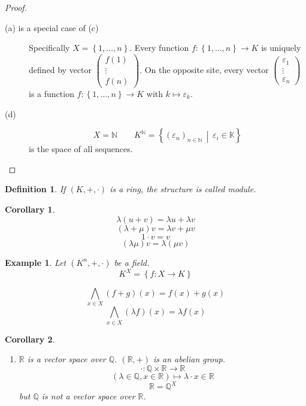 \documentclass[a4paper,landscape,twocolumn]{article}
\newcommand\set[1]{\left\{#1\right\}}
\newcommand\setdef[2]{\left\{#1\,\middle|\,#2\right\}}
\newtheorem{defi}{Definition}
\newtheorem{ex}{Example}
\newtheorem{cor}{Corollary}
\begin{document}
\begin{proof}
  \begin{description}
    \item[(a) is a special case of (c)]
      Specifically $X = \set{1, \ldots, n}$.
      Every function $f: \set{1, \ldots, n} \rightarrow K$ is uniquely defined
      by vector $\begin{pmatrix} f(1) \\ \vdots \\ f(n) \end{pmatrix}$.
      On the opposite site, every vector
      $\begin{pmatrix} \varepsilon_1 \\ \vdots \\ \varepsilon_n \end{pmatrix}$
      is a function $f: \set{1, \ldots, n} \rightarrow K$ with $k \mapsto \varepsilon_k$.
    \item[(d)]
      \[ X = \mathbb N \qquad K^{\mathbb N} = \setdef{(\varepsilon_n)_{n \in \mathbb N}}{\varepsilon_i \in \mathbb K} \]
      is the space of all sequences.
  \end{description}
\end{proof}

\begin{defi}
  If $(K, +, \cdot)$ is a ring, the structure is called \emph{module}.
\end{defi}

\begin{cor}
  \[ \lambda (u + v) = \lambda u + \lambda v \]
  \[ (\lambda + \mu) v = \lambda v + \mu v \]
  \[ 1 \cdot v = v \]
  \[ (\lambda \mu) v = \lambda (\mu v) \]
\end{cor}

\begin{ex}
  Let $(K^n, +, \cdot)$ be a field.
  \[ K^X = \set{f: X \rightarrow K} \]

  \[ \bigwedge_{x \in X} (f + g)(x) = f(x) + g(x) \]
  \[ \bigwedge_{x \in X} (\lambda f)(x) = \lambda f(x) \]
\end{ex}

\begin{cor}
  \begin{enumerate}
    \item[(e)]
      $\mathbb R$ is a vector space over $\mathbb Q$.
      $(\mathbb R, +)$ is an abelian group.
      \[ \cdot: \mathbb Q \times \mathbb R \rightarrow \mathbb R \]
      \[ (\lambda \in \mathbb Q, x \in \mathbb R) \mapsto \lambda \cdot x \in \mathbb R \]
      \[ \mathbb R = \mathbb Q^X \]
      but $\mathbb Q$ is \emph{not} a vector space over $\mathbb R$.
  \end{enumerate}
\end{cor}
\end{document}
